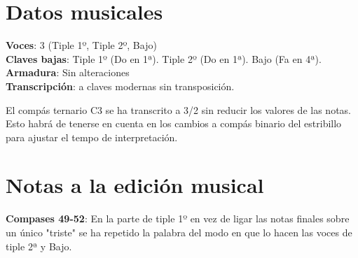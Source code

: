 
\section*{\centering\Large{Datos musicales}}
\noindent \textbf{Voces}: 3 (Tiple 1º, Tiple 2º, Bajo)\\
\textbf{Claves bajas}: Tiple 1º (Do en 1ª). Tiple 2º (Do en 1ª). Bajo
(Fa en 4ª).\\
\textbf{Armadura}: Sin alteraciones\\
\textbf{Transcripción}: a claves modernas sin transposición.


El compás ternario C3 se ha transcrito a 3/2 sin reducir los valores de
las notas. Esto habrá de tenerse en cuenta en los cambios a compás
binario del estribillo para ajustar el tempo de interpretación.

\section*{\centering\Large{Notas a la edición musical}}
\noindent \textbf{Compases 49-52}: En la parte de tiple 1º en vez de ligar las notas finales sobre un único "triste" se ha repetido la palabra del modo en que lo hacen las voces de tiple 2ª y Bajo.
